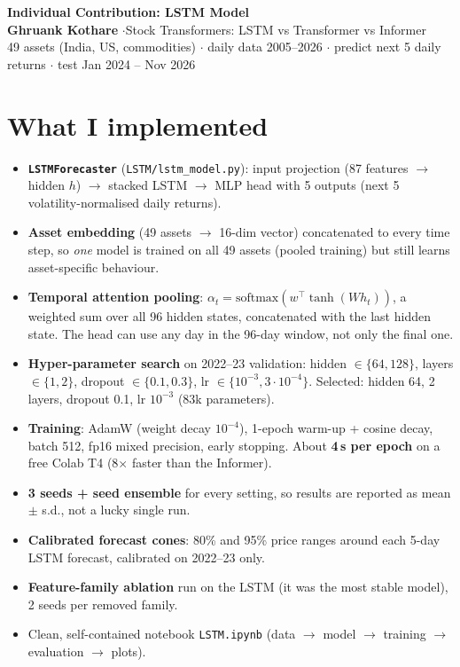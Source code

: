 \documentclass[10pt,a4paper]{article}
\begin{document}
\begin{center}
{\Large\bfseries Individual Contribution: LSTM Model}\\[2pt]
\textbf{Ghruank Kothare} \quad$\cdot$\quad Stock Transformers: LSTM vs Transformer vs Informer\\[1pt]
\small 49 assets (India, US, commodities) $\cdot$ daily data 2005--2026 $\cdot$ predict next 5 daily returns $\cdot$ test Jan 2024 -- Nov 2026
\end{center}

\section{What I implemented}
\begin{itemize}
  \item \textbf{\texttt{LSTMForecaster}} (\texttt{LSTM/lstm\_model.py}): input projection (87 features $\to$ hidden $h$) $\to$ stacked LSTM $\to$ MLP head with 5 outputs (next 5 volatility-normalised daily returns).
  \item \textbf{Asset embedding} (49 assets $\to$ 16-dim vector) concatenated to every time step, so \emph{one} model is trained on all 49 assets (pooled training) but still learns asset-specific behaviour.
  \item \textbf{Temporal attention pooling}: $\alpha_t=\mathrm{softmax}(w^\top\tanh(Wh_t))$, a weighted sum over all 96 hidden states, concatenated with the last hidden state. The head can use any day in the 96-day window, not only the final one.
  \item \textbf{Hyper-parameter search} on 2022--23 validation: hidden $\in\{64,128\}$, layers $\in\{1,2\}$, dropout $\in\{0.1,0.3\}$, lr $\in\{10^{-3},3\cdot10^{-4}\}$. Selected: hidden 64, 2 layers, dropout 0.1, lr $10^{-3}$ (83k parameters).
  \item \textbf{Training}: AdamW (weight decay $10^{-4}$), 1-epoch warm-up + cosine decay, batch 512, fp16 mixed precision, early stopping. About \textbf{4\,s per epoch} on a free Colab T4 (8$\times$ faster than the Informer).
  \item \textbf{3 seeds + seed ensemble} for every setting, so results are reported as mean $\pm$ s.d., not a lucky single run.
  \item \textbf{Calibrated forecast cones}: 80\% and 95\% price ranges around each 5-day LSTM forecast, calibrated on 2022--23 only.
  \item \textbf{Feature-family ablation} run on the LSTM (it was the most stable model), 2 seeds per removed family.
  \item Clean, self-contained notebook \texttt{LSTM.ipynb} (data $\to$ model $\to$ training $\to$ evaluation $\to$ plots).
\end{itemize}
\end{document}
